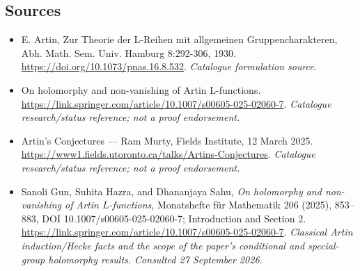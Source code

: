 \documentclass[11pt,a4paper]{article}
\numberwithin{equation}{section}
\begin{document}
\subsection{Sources}
\begin{itemize}\raggedright
\item[\textnormal{[S1]}]\hypertarget{source:statement:1}{} E. Artin, Zur Theorie der L-Reihen mit allgemeinen Gruppencharakteren, Abh. Math. Sem. Univ. Hamburg 8:292-306, 1930.
\url{https://doi.org/10.1073/pnas.16.8.532}.
{\small\textit{Catalogue formulation source.}}
\item[\textnormal{[S2]}]\hypertarget{source:statement:2}{} On holomorphy and non-vanishing of Artin L-functions.
\url{https://link.springer.com/article/10.1007/s00605-025-02060-7}.
{\small\textit{Catalogue research/status reference; not a proof endorsement.}}
\item[\textnormal{[S3]}]\hypertarget{source:statement:3}{} Artin's Conjectures — Ram Murty, Fields Institute, 12 March 2025.
\url{https://www1.fields.utoronto.ca/talks/Artins-Conjectures}.
{\small\textit{Catalogue research/status reference; not a proof endorsement.}}

\item[\textnormal{[E1]}]\hypertarget{extra:statement:1}{} Sanoli Gun, Suhita Hazra, and Dhananjaya Sahu, \emph{On holomorphy and non-vanishing of Artin $L$-functions}, Monatshefte für Mathematik 206 (2025), 853--883, DOI 10.1007/s00605-025-02060-7; Introduction and Section 2.
\url{https://link.springer.com/article/10.1007/s00605-025-02060-7}.
{\small\textit{Classical Artin induction/Hecke facts and the scope of the paper's conditional and special-group holomorphy results. Consulted 27 September 2026.}}
\end{itemize}
\end{document}
